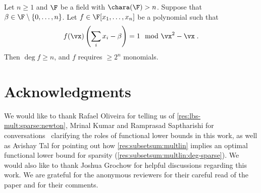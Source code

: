 \documentclass{toc}
\begin{document}
\begin{corollarywp}\label{res:subsetsum:multlin:deg-sparse}
        Let $n\ge 1$ and $\F$ be a field with $\chara(\F)>n$.  Suppose that $\beta\in \F\setminus\{0,\ldots,n\}$. Let $f\in\F[x_1,\ldots,x_n]$ be a polynomial such that
        \[
                f(\vx)\left(\sum_i x_i-\beta\right)=1 \mod \vx^2-\vx
                \;.
        \]
        Then $\deg f\ge n$, and $f$ requires $\ge 2^n$ monomials.
\end{corollarywp}


%
%
%


\section*{Acknowledgments}

We would like to thank Rafael %
Oliveira  %
for telling us of \autoref{res:lbs-mult:sparse:newton}, Mrinal Kumar and Ramprasad Saptharishi for conversations~\cite{ForbesKS16} clarifying the roles of functional lower bounds in this work, as well as Avishay Tal for pointing out how \autoref{res:subsetsum:multlin} implies an optimal functional lower bound for sparsity (\autoref{res:subsetsum:multlin:deg-sparse}).  We would also like to thank Joshua Grochow for helpful discussions regarding this work. We are grateful for the anonymous reviewers for their careful read of the paper and for their comments.


%
%
%



%
\nocite{GuptaKKS13b}
\nocite{CookReckhow74b}



%
%

%

\end{document}
